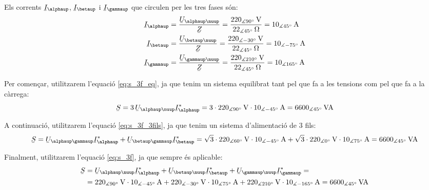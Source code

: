 \begin{exemple}
    Els corrents $\cmplx{I}_\alphaup$, $\cmplx{I}_\betaup$ i $\cmplx{I}_\gammaup$ que
    circulen  per les tres fases s\'{o}n:
    \begin{align*}
        \cmplx{I}_\alphaup &=\frac{\cmplx{U}_{\alphaup\nuup}}{\cmplx{Z}} =
        \frac{220_{\measuredangle 90\degree}\unit{V}}{22_{\measuredangle
    45\degree}\unit{\ohm}} =
        10_{\measuredangle 45\degree}\unit{A}\\
        \cmplx{I}_\betaup &=\frac{\cmplx{U}_{\betaup\nuup}}{\cmplx{Z}} =
        \frac{220_{\measuredangle -30\degree}\unit{V}}{22_{\measuredangle
    45\degree}\unit{\ohm}} =
        10_{\measuredangle -75\degree}\unit{A}\\
        \cmplx{I}_\gammaup &=\frac{\cmplx{U}_{\gammaup\nuup}}{\cmplx{Z}} =
        \frac{220_{\measuredangle 210\degree}\unit{V}}{22_{\measuredangle
    45\degree}\unit{\ohm} } =
        10_{\measuredangle 165\degree}\unit{A}
    \end{align*}


    Per comen\c{c}ar,  utilitzarem l'equaci\'{o} \eqref{eq:s_3f_eq}, ja que tenim
    un sistema equilibrat tant pel que fa a les tensions com pel que fa a la c\`{a}rrega:
    \[
    \cmplx{S} = 3\,\cmplx{U}_{\alphaup\nuup} \cmplx{I}_\alphaup^* =
    3\cdot 220_{\measuredangle 90\degree}\unit{V} \cdot
    10_{\measuredangle -45\degree}\unit{A} = 6600_{\measuredangle 45\degree}\unit{VA}
    \]

    A continuaci\'{o},  utilitzarem l'equaci\'{o} \eqref{eq:s_3f_3fils}, ja que tenim
    un sistema d'alimentaci\'{o} de 3 fils:
    \[
    \cmplx{S} = \cmplx{U}_{\alphaup\gammaup} \cmplx{I}_\alphaup^*
     +  \cmplx{U}_{\betaup\gammaup} \cmplx{I}_\betaup^* =
    \sqrt{3}\cdot220_{\measuredangle 60\degree}\unit{V} \cdot
    10_{\measuredangle -45\degree}\unit{A} + \sqrt{3}\cdot220_{\measuredangle 0\degree}\unit{V}
    \cdot 10_{\measuredangle 75\degree}\unit{A}  = 6600_{\measuredangle 45\degree}\unit{VA}
    \]

     Finalment,  utilitzarem l'equaci\'{o} \eqref{eq:s_3f}, ja que
     sempre \'{e}s aplicable:
     \[\begin{split}
     \cmplx{S} &=  \cmplx{U}_{\alphaup\nuup} \cmplx{I}_\alphaup^* +
     \cmplx{U}_{\betaup\nuup} \cmplx{I}_\betaup^* +  \cmplx{U}_{\gammaup\nuup}
     \cmplx{I}_\gammaup^* =\\
     &= 220_{\measuredangle 90\degree}\unit{V}
     \cdot 10_{\measuredangle -45\degree}\unit{A} + 220_{\measuredangle
     -30\degree}\unit{V} \cdot 10_{\measuredangle 75\degree}\unit{A}
     + 220_{\measuredangle 210\degree}\unit{V} \cdot 10_{\measuredangle
     -165\degree}\unit{A} =6600_{\measuredangle 45\degree}\unit{VA}
     \end{split} \]


\end{exemple}

